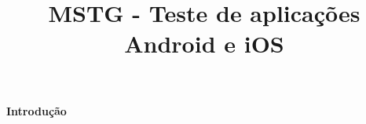 %
\title{MSTG - Teste de aplicações Android e iOS}
%
%
\author{}
%
%
%
\maketitle              %
%
\begin{abstract}

\end{abstract}
%
%
\begin{center}
\normalsize{\bfseries Introdução}\hfill 
\end{center}






